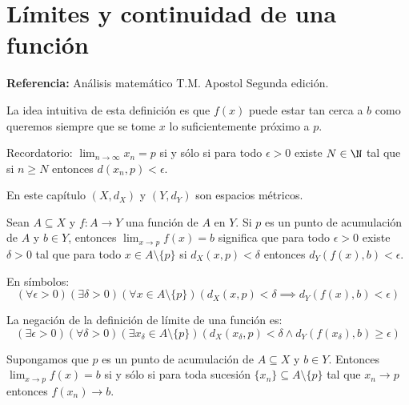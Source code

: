 \chapter{Límites y continuidad de una función} %
\textbf{Referencia:} Análisis matemático T.M. Apostol Segunda edición. %

La idea intuitiva de esta definición es que $f(x)$ puede estar tan cerca a $b$ como queremos siempre que se tome $x$ lo suficientemente próximo a $p$. %

Recordatorio: $\lim_{n \to \infty} x_n = p$ si y sólo si para todo $\epsilon > 0$ existe $N \in \N$ tal que si $n \ge N$ entonces $d(x_n, p) < \epsilon$. %

En este capítulo $(X, d_X)$ y $(Y, d_Y)$ son espacios métricos. %

\begin{definicion} %
Sean $A \subseteq X$ y $f: A \to Y$ una función de $A$ en $Y$. %
Si $p$ es un punto de acumulación de $A$ y $b \in Y$, %
entonces $\lim_{x \to p} f(x) = b$ significa que para todo $\epsilon > 0$ existe $\delta > 0$ %
tal que para todo $x \in A \setminus \{p\}$ si $d_X(x, p) < \delta$ entonces $d_Y(f(x), b) < \epsilon$. %

En símbolos:
$$ (\forall \epsilon > 0)(\exists \delta > 0)(\forall x \in A \setminus \{p\})(d_X(x, p) < \delta \implies d_Y(f(x), b) < \epsilon) $$ %
\end{definicion}

\begin{remark}
La negación de la definición de límite de una función es: %
$$ (\exists \epsilon > 0)(\forall \delta > 0)(\exists x_\delta \in A \setminus \{p\})(d_X(x_\delta, p) < \delta \land d_Y(f(x_\delta), b) \ge \epsilon) $$ %
\end{remark}

\begin{teorema} %
Supongamos que $p$ es un punto de acumulación de $A \subseteq X$ y $b \in Y$. %
Entonces $\lim_{x \to p} f(x) = b$ si y sólo si %
para toda sucesión $\{x_n\} \subseteq A \setminus \{p\}$ tal que $x_n \to p$ entonces $f(x_n) \to b$. %
\end{teorema}

